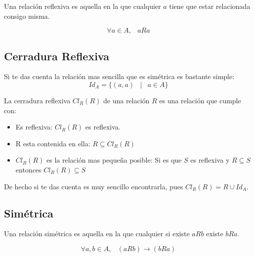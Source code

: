 \documentclass[12pt]{report}                                    %
\DeclareMathOperator \Space {\quad}                             %
\DeclareMathOperator \MiniSpace {\;}                            %
\newcommand \Such {\MiniSpace|\MiniSpace}                       %
\begin{document}
                Una relación reflexiva es aquella en la que cualquier $a$ tiene que estar relacionada
                consigo misma.

                \begin{equation}
                    \forall a \in A, \MiniSpace aRa
                \end{equation}


            \subsection*{Cerradura Reflexiva}

                Si te das cuenta la relación mas sencilla que es simétrica es bastante simple:
                \begin{equation}
                    Id_A = \{ (a, a) \Such a \in A \}
                \end{equation}


                La cerradura reflexiva $Cl_R(R)$ de una relación $R$ es una relación que cumple con:

                \begin{itemize}
                    \item Es reflexiva: $Cl_R(R)$ es reflexiva. 
                    \item R esta contenida en ella: $R \subseteq Cl_R(R)$
                    \item $Cl_R(R)$ es la relación mas pequeña posible: 
                    Si es que $S$ es reflexiva y $R \subseteq S$ entonces $Cl_R(R) \subseteq S$
                \end{itemize}



                De hecho si te das cuenta es muy sencillo encontrarla, pues
                $Cl_R(R) = R \cup Id_A$.




            \clearpage
            \subsection{Simétrica}

                Una relación simétrica es aquella en la que cualquier si existe $aRb$ existe $bRa$.

                \begin{equation}
                    \forall a,b \in A,\MiniSpace (aRb) \to (bRa)
                \end{equation}
\end{document}
